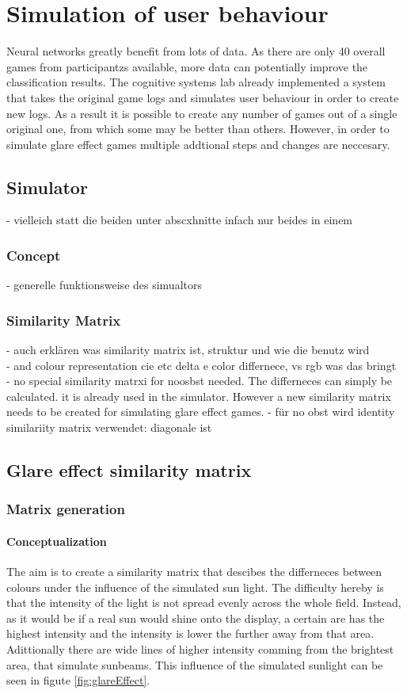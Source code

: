 \chapter{Simulation of user behaviour}
Neural networks greatly benefit from lots of data. As there are only 40  overall games from participantzs available, more data can potentially improve the classification results.  The cognitive systems lab already implemented a system that takes the original game logs and simulates user behaviour in order to create new logs. As a result it is possible to create any number of games out of a single original one, from which some may be better than others. However, in order to simulate glare effect games multiple addtional steps and changes are neccesary. 

\section{Simulator}
- vielleich statt die beiden unter abscxhnitte infach nur beides in einem 
\subsection{Concept}
- generelle funktionsweise des simualtors
\subsection{Similarity Matrix}
- auch erklären was similarity matrix ist, struktur und wie die benutz wird\\
- and colour representation cie etc delta e color differnece, vs rgb was das bringt\\ 
- no special similarity matrxi for noosbst needed. The differneces can simply be calculated. it is already used in the simulator. However a new similarity matrix needs to be created for simulating glare effect games. 
- für no obst wird identity similariity matrix verwendet: diagonale ist 

\section{Glare effect similarity matrix}
\subsection{Matrix generation}
\subsubsection{Conceptualization}
The aim is to create a similarity matrix that descibes the differneces between colours under the influence of the simulated sun light. The difficulty hereby is that the intensity of the light is not spread evenly across the whole field. Instead, as it would be if a real sun would shine onto the display, a certain are has the highest intensity and the intensity is lower the further away from that area. Adittionally there are wide lines of higher intensity comming from the brightest area, that simulate sunbeams. This influence of the simulated sunlight can be seen in figute \ref{fig:glareEffect}. 

